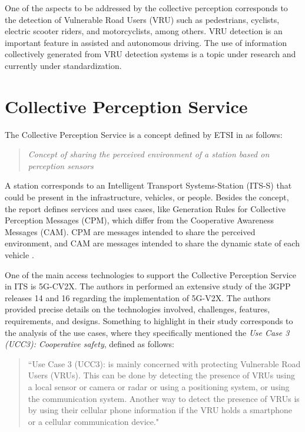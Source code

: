 One of the aspects to be addressed by the collective perception corresponds to the detection of Vulnerable Road Users (VRU) such as pedestrians, cyclists, electric scooter riders, and motorcyclists, among others. VRU detection is an important feature in assisted and autonomous driving. The use of information collectively generated from VRU detection systems is a topic under research and currently under standardization. 
\section{Collective Perception Service}
The Collective Perception Service is a concept defined by ETSI in \cite{ETSI} as follows:
\begin{quote}
\textit{Concept of sharing the perceived environment of a station based on perception sensors}
\end{quote}
A station corresponds to an Intelligent Transport Systems-Station (ITS-S) that could be present in the infrastructure, vehicles, or people.
Besides the concept, the report defines services and uses cases, like Generation Rules for Collective Perception Messages (CPM), which differ from the Cooperative Awareness Messages (CAM). CPM are messages intended to share the perceived environment, and CAM are messages intended to share the dynamic state of each vehicle \cite{ETSI2}.

One of the main access technologies to support the Collective Perception Service in ITS is 5G-CV2X. The authors in \cite{hakeem20205g} performed an extensive study of the 3GPP releases 14 and 16 regarding the implementation of 5G-V2X. The authors provided precise details on the technologies involved, challenges, features, requirements, and designs. Something to highlight in their study corresponds to the analysis of the use cases, where they specifically mentioned the \textit{Use Case 3 (UCC3): Cooperative safety}, defined as follows:

\begin{quote}
``Use Case 3 (UCC3): is mainly concerned with protecting Vulnerable Road Users (VRUs). This can be done by detecting the presence of VRUs using a local sensor or camera or radar or using a positioning system, or using the communication system. Another way to detect the presence of VRUs is by using their cellular phone information if the VRU holds a smartphone or a cellular communication device."
\end{quote}

